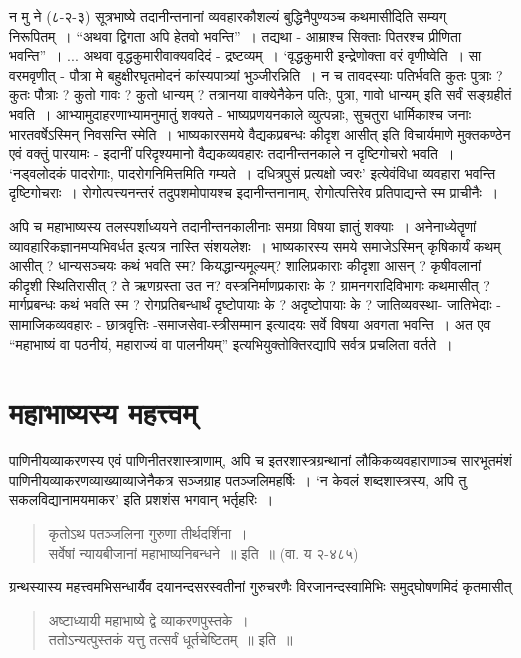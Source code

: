 {न मु ने (८-२-३) सूत्रभाष्ये तदानीन्तनानां व्यवहारकौशल्यं बुद्धिनैपुण्यञ्च कथमा\-सीदिति सम्यग् निरूपितम्~। “अथवा द्विगता अपि हेतवो भवन्ति”~। तद्यथा - आम्राश्च सिक्ताः पितरश्च प्रीणिता भवन्ति”~। ... अथवा वृद्धकुमारीवाक्यवदिदं - द्रष्टव्यम्~। ‘वृद्धकुमारी इन्द्रेणोक्ता वरं वृणीष्वेति~। सा वरमवृणीत् - पौत्रा मे बहुक्षीरघृतमोदनं कांस्यपात्र्यां भुञ्जीरन्निति~। न च तावदस्याः पतिर्भवति कुतः पुत्राः ? कुतः पौत्राः ? कुतो गावः ? कुतो धान्यम् ?  तत्रानया वाक्येनैकेन पतिः, पुत्रा, गावो धान्यम् इति सर्वं सङ्ग्रहीतं भवति~। आभ्यामुदाहरणाभ्यामनुमातुं शक्यते - भाष्यप्रणयनकाले व्युत्पन्नाः, सुचतुरा धार्मिकाश्च जनाः भारतवर्षेऽस्मिन् निवसन्ति स्मेति~। भाष्यकारसमये वैद्यकप्रबन्धः कीदृश आसीत् इति विचार्यमाणे मुक्तकण्ठेन एवं वक्तुं पारयामः - इदानीं परिदृश्यमानो वैद्यकव्यवहारः तदानीन्तनकाले न दृष्टिगोचरो भवति~। ‘नड्वलोदकं पादरोगाः, पादरोगनिमित्तमिति गम्यते~। दधित्रपुसं प्रत्यक्षो ज्वरः’ इत्येवंविधा व्यवहारा भवन्ति दृष्टिगोचराः~। रोगोत्पत्त्यनन्तरं तदुपशमोपायश्च इदानीन्तनानाम्, रोगोत्पत्तिरेव प्रतिपाद्यन्ते स्म प्राचीनैः~। 

अपि च महाभाष्यस्य तलस्पर्शाध्ययने तदानीन्तनकालीनाः समग्रा विषया ज्ञातुं शक्याः~। अनेनाध्येतॄणां व्यावहारिकज्ञानमप्यभिवर्धत इत्यत्र नास्ति संशयलेशः~। भाष्यकारस्य समये समाजेऽस्मिन् कृषिकार्यं कथम् आसीत् ? धान्यसञ्चयः कथं भवति स्म? कियद्धान्यमूल्यम्? शालिप्रकाराः कीदृशा आसन् ? कृषीवलानां कीदृशी स्थितिरासीत् ? ते ऋणग्रस्ता उत न? वस्त्रनिर्माणप्रकाराः के ? ग्रामनगरादिविभागः कथमासीत् ? मार्गप्रबन्धः कथं भवति स्म ? रोगप्रतिबन्धार्थं दृष्टोपायाः के ? अदृष्टोपायाः के ? जातिव्यवस्था- जातिभेदाः - सामाजिकव्यवहारः - छात्रवृत्तिः -समाजसेवा-स्त्रीसम्मान इत्यादयः सर्वे विषया अवगता भवन्ति~। अत एव “महाभाष्यं वा पठनीयं, महाराज्यं वा पालनीयम्” इत्यभियुक्तोक्तिरद्यापि सर्वत्र प्रचलिता वर्तते~। 

\section*{महाभाष्यस्य महत्त्वम्}

पाणिनीयव्याकरणस्य एवं पाणिनीतरशास्त्राणाम्, अपि च इतरशास्त्रग्रन्थानां लौकिक\-व्यवहाराणाञ्च सारभूतमंशं पाणिनीयव्याकरणव्याख्याव्याजेनैकत्र सञ्जग्राह पतञ्जलिमहर्षिः~। ‘न केवलं शब्दशास्त्रस्य, अपि तु सकलविद्यानामयमाकर’ इति प्रशशंस भगवान् भर्तृहरिः~। 
\begin{verse}
कृतोऽथ पतञ्जलिना गुरुणा तीर्थदर्शिना~। \\
सर्वेषां न्यायबीजानां महाभाष्यनिबन्धने~॥ इति~॥ (वा. य २-४८५)
\end{verse}
ग्रन्थस्यास्य महत्त्वमभिसन्धार्यैव दयानन्दसरस्वतीनां गुरुचरणैः विरजानन्दस्वामिभिः \-समुद्घोषणमिदं कृतमासीत् 
\begin{verse}
अष्टाध्यायी महाभाष्ये द्वे व्याकरणपुस्तके~। \\
ततोऽन्यत्पुस्तकं यत्तु तत्सर्वं धूर्तचेष्टितम्~॥ इति~॥
\end{verse}

}
